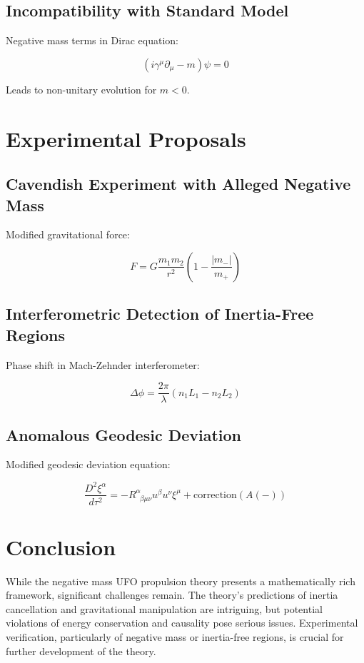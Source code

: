 \documentclass{article}
\begin{document}
\subsection{Incompatibility with Standard Model}

Negative mass terms in Dirac equation:

\begin{equation}
    (i\gamma^\mu \partial_\mu - m)\psi = 0
\end{equation}

Leads to non-unitary evolution for $m < 0$.

\section{Experimental Proposals}

\subsection{Cavendish Experiment with Alleged Negative Mass}

Modified gravitational force:

\begin{equation}
    F = G\frac{m_1 m_2}{r^2} (1 - \frac{|m_-|}{m_+})
\end{equation}

\subsection{Interferometric Detection of Inertia-Free Regions}

Phase shift in Mach-Zehnder interferometer:

\begin{equation}
    \Delta \phi = \frac{2\pi}{\lambda} (n_1 L_1 - n_2 L_2)
\end{equation}

\subsection{Anomalous Geodesic Deviation}

Modified geodesic deviation equation:

\begin{equation}
    \frac{D^2 \xi^\alpha}{d\tau^2} = -R^\alpha_{\;\;\beta\mu\nu} u^\beta u^\nu \xi^\mu + \text{correction}(A(-))
\end{equation}

\section{Conclusion}

While the negative mass UFO propulsion theory presents a mathematically rich framework, significant challenges remain. The theory's predictions of inertia cancellation and gravitational manipulation are intriguing, but potential violations of energy conservation and causality pose serious issues. Experimental verification, particularly of negative mass or inertia-free regions, is crucial for further development of the theory.
\end{document}

